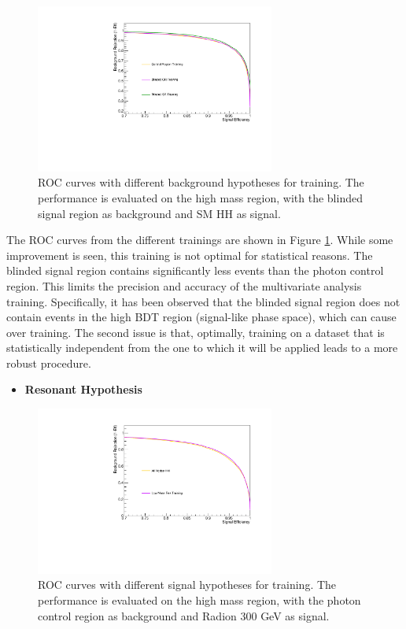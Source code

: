 \begin{figure}[h]
  \centering
  \includegraphics[width=0.7\textwidth]{figures/sec-cats/mva/ROC_BCR}\hfil
  \caption{ROC curves with different background hypotheses for training. The performance is evaluated on the high mass region, with the blinded signal region as background and SM HH as signal.}
  \label{fig:mva_cc_background}
\end{figure}

The ROC curves from the different trainings are shown in Figure \ref{fig:mva_cc_background}. 
While some improvement is seen, this training is not optimal for statistical reasons. 
The blinded signal region contains significantly less events than the photon control region. 
This limits the precision and accuracy of the multivariate analysis training. 
Specifically, it has been observed that the blinded signal region does not contain events in the high BDT region (signal-like phase space), which can cause over training. 
The second issue is that, optimally, training on a dataset that is statistically independent from the one to which it will be applied leads to a more robust procedure. 



\begin{itemize}
\item \textbf{Resonant Hypothesis}
\end{itemize}

\begin{figure}[h]
  \centering
  \includegraphics[width=0.7\textwidth]{figures/sec-cats/mva/ROC_res}\hfil
  \caption{ROC curves with different signal hypotheses for training. The performance is evaluated on the high mass region, with the photon control region as background and Radion 300 GeV as signal.}
  \label{fig:mva_cc_res}
\end{figure}

